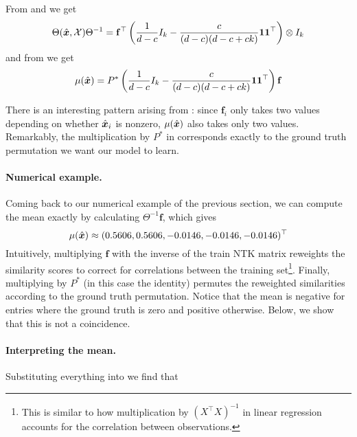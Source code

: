 From  and  we get 
\begin{equation}
    \label{eq:firstprod}
    \Theta(\hat{\boldsymbol{x}}, \mathcal{X})\Theta^{-1} = \mathbf{f}^\top \left(\frac{1}{d-c} I_k - \frac{c}{(d-c)(d-c+ck)}\boldsymbol{1}\boldsymbol{1}^\top\right) \otimes I_k
\end{equation}
and from  we get 
\begin{equation}
    \label{eq:mean_final}
    \mu(\hat{\boldsymbol{x}}) = P^*\left(\frac{1}{d-c} I_k - \frac{c}{(d-c)(d-c+ck)}\boldsymbol{1}\boldsymbol{1}^\top\right)\mathbf{f}
\end{equation}

There is an interesting pattern arising from : since $\mathbf{f}_i$ only takes two values depending on whether $\hat{\boldsymbol{x}}_i$ is nonzero, $\mu(\hat{\boldsymbol{x}})$ also takes only two values. Remarkably, the multiplication by $P^*$ in  corresponds exactly to the ground truth permutation we want our model to learn. 

\paragraph{Numerical example.} 
Coming back to our numerical example of the previous section, we can compute the mean exactly by calculating $\Theta^{-1}\mathbf{f}$, which gives
\begin{equation*}
\mu(\hat{\boldsymbol{x}}) \approx (0.5606, 0.5606, -0.0146, -0.0146, -0.0146)^\top
\end{equation*}
Intuitively, multiplying $\mathbf{f}$ with the inverse of the train NTK matrix reweights the similarity scores to correct for correlations between the training set\footnote{This is similar to how multiplication by $(X^\top X)^{-1}$ in linear regression accounts for the correlation between observations.}. Finally, multiplying by $P^*$ (in this case the identity) permutes the reweighted similarities according to the ground truth permutation. Notice that the mean is negative for entries where the ground truth is zero and positive otherwise. Below, we show that this is not a coincidence.

\paragraph{Interpreting the mean.}
Substituting everything into  we find that 

